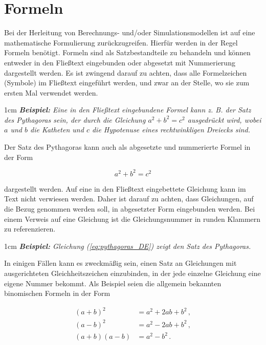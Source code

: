 \chapter{Formeln}
\label{cha:Formeln}

Bei der Herleitung von Berechnungs- und/oder Simulationsmodellen ist auf eine mathematische Formulierung zurückzugreifen. Hierfür werden in der Regel Formeln benötigt. Formeln sind als Satzbestandteile zu behandeln und können entweder in den Fließtext eingebunden oder abgesetzt mit Nummerierung dargestellt werden. Es ist zwingend darauf zu achten, dass alle Formelzeichen (Symbole) im Fließtext eingeführt werden, und zwar an der Stelle, wo sie zum ersten Mal verwendet werden.

\begin{addmargin}[1cm]{1cm}
	\textit{\textbf{Beispiel:} Eine in den Fließtext eingebundene Formel kann z. B. der Satz des Pythagoras sein, der durch die Gleichung $a^2+b^2=c^2$ ausgedrückt wird, wobei $a$ und $b$ die Katheten und $c$ die Hypotenuse eines rechtwinkligen Dreiecks sind.}
\end{addmargin}

Der Satz des Pythagoras kann auch als abgesetzte und nummerierte Formel in der Form

\begin{equation}
	a^2+b^2=c^2
	\label{eq:pythagoras_DE}
\end{equation}

dargestellt werden. Auf eine in den Fließtext eingebettete Gleichung kann im Text nicht verwiesen werden. Daher ist darauf zu achten, dass Gleichungen, auf die Bezug genommen werden soll, in abgesetzter Form eingebunden werden. Bei einem Verweis auf eine Gleichung ist die Gleichungsnummer in runden Klammern zu referenzieren. 

\begin{addmargin}[1cm]{1cm}
	\textit{\textbf{Beispiel:} Gleichung (\ref{eq:pythagoras_DE}) zeigt den Satz des Pythagoras.}
\end{addmargin}

In einigen Fällen kann es zweckmäßig sein, einen Satz an Gleichungen mit ausgerichteten Gleichheitszeichen einzubinden, in der jede einzelne Gleichung eine eigene Nummer bekommt. Als Beispiel seien die allgemein bekannten binomischen Formeln in der Form

\begin{align}
(a+b)^2 & = a^2 + 2ab + b^2 \, , \label{eq:bin-1_DE} \\
(a-b)^2 & = a^2 - 2ab + b^2 \, , \label{eq:bin-2_DE} \\
(a+b)(a-b) & = a^2 - b^2 \, . \label{eq:bin-3_DE} 
\end{align}

